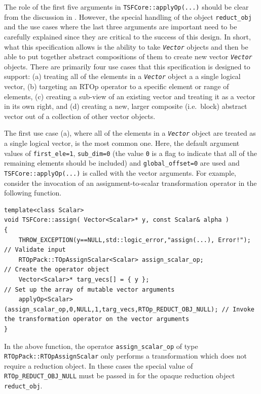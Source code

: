 The role of the first five arguments in \texttt{TSFCore::applyOp(\-...)}
should be clear from the discussion in \cite{ref:rtop_toms}.  However,
the special handling of the object \texttt{reduct\_obj} and the use
cases where the last three arguments are important need to be
carefully explained since they are critical to the success of this
design.  In short, what this specification allows is the ability to
take \texttt{\textit{Vector}} objects and then be able to put together
abstract compositions of them to create new vector
\texttt{\textit{Vector}} objects.  There are primarily four use cases
that this specification is designed to support: (a) treating all of
the elements in a \texttt{\textit{Vector}} object a a single logical
vector, (b) targeting an RTOp operator to a specific element or range
of elements, (c) creating a sub-view of an existing vector and
treating it as a vector in its own right, and (d) creating a new,
larger composite (i.e.~block) abstract vector out of a collection of
other vector objects.

The first use case (a), where all of the elements in a
\texttt{\textit{Vector}} object are treated as a single logical
vector, is the most common one.  Here, the default argument values of
\texttt{first\_ele=1}, \texttt{sub\_dim=0} (the value \texttt{0} is a
flag to indicate that all of the remaining elements should be
included) and \texttt{global\_offset=0} are used and
\texttt{TSFCore::applyOp(\-...)} is called with the vector arguments.
For example, consider the invocation of an assignment-to-scalar
transformation operator in the following function.

{\tiny\begin{verbatim}
template<class Scalar>
void TSFCore::assign( Vector<Scalar>* y, const Scalar& alpha )
{
    THROW_EXCEPTION(y==NULL,std::logic_error,"assign(...), Error!");           // Validate input
    RTOpPack::TOpAssignScalar<Scalar> assign_scalar_op;                        // Create the operator object
    Vector<Scalar>* targ_vecs[] = { y };                                       // Set up the array of mutable vector arguments
    applyOp<Scalar>(assign_scalar_op,0,NULL,1,targ_vecs,RTOp_REDUCT_OBJ_NULL); // Invoke the transformation operator on the vector arguments
}
\end{verbatim}}

In the above function, the operator \texttt{assign\_scalar\_op} of type
\texttt{RTOpPack::RTOpAssignScalar} only performs a transformation which
does not require a reduction object.  In these cases the special value
of \texttt{RTOp\_REDUCT\_OBJ\_NULL} must be passed in for the
opaque reduction object \texttt{reduct\_obj}.

